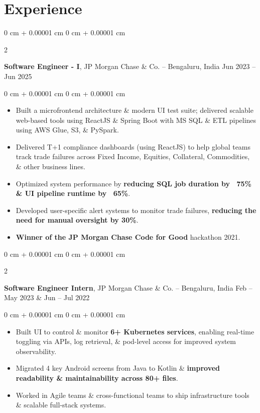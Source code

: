 \documentclass[10pt, a4paper]{article}
\newenvironment{highlights}{
    \begin{itemize}[
        topsep=0 cm,
        parsep=0 cm,
        partopsep=0pt,
        itemsep=0pt,
        leftmargin=0 cm + 10pt
    ]
}{
    \end{itemize}
} %
\newenvironment{onecolentry}{
    \begin{adjustwidth}{
        0 cm + 0.00001 cm
    }{
        0 cm + 0.00001 cm
    }
}{
    \end{adjustwidth}
} %
\newenvironment{twocolentry}[2][]{
    \onecolentry
    \def\secondColumn{#2}
    \setcolumnwidth{\fill, 6.0 cm}
    \begin{paracol}{2}
}{
    \switchcolumn \raggedleft \secondColumn
    \end{paracol}
    \endonecolentry
} %
\begin{document}
    \section{Experience}
        \begin{twocolentry}{
            Jun 2023 – Jun 2025
        }
            \textbf{Software Engineer - I}, JP Morgan Chase \& Co. -- Bengaluru, India\end{twocolentry}
        \vspace{0.10 cm}
        \begin{onecolentry}
            \begin{highlights}
                \item Built a microfrontend architecture \& modern UI test suite; delivered scalable web-based tools using ReactJS \& Spring Boot with MS SQL \& ETL pipelines using AWS Glue, S3, \& PySpark.
                \item Delivered T+1 compliance dashboards (using ReactJS) to help global teams track trade failures across Fixed Income, Equities, Collateral, Commodities, \& other business lines.
                \item Optimized system performance by \textbf{reducing SQL job duration by ~75\% \& UI pipeline runtime by ~65\%}.
                \item Developed user-specific alert systems to monitor trade failures, \textbf{reducing the need for manual oversight by 30\%}.
                \item \textbf{Winner of the JP Morgan Chase Code for Good} hackathon 2021.
            \end{highlights}
        \end{onecolentry}


        \vspace{0.10 cm}

        \begin{twocolentry}{
            Feb – May 2023 \& Jun – Jul 2022
        }
            \textbf{Software Engineer Intern}, JP Morgan Chase \& Co. -- Bengaluru, India\end{twocolentry}

        \vspace{0.10 cm}
        \begin{onecolentry}
            \begin{highlights}
                \item Built UI to control \& monitor \textbf{6+ Kubernetes services}, enabling real-time toggling via APIs, log retrieval, \& pod-level access for improved system observability.
                \item Migrated 4 key Android screens from Java to Kotlin \& \textbf{improved readability \& maintainability across 80+ files}.
                \item Worked in Agile teams \& cross-functional teams to ship infrastructure tools \& scalable full-stack systems.
            \end{highlights}
        \end{onecolentry}
\end{document}
